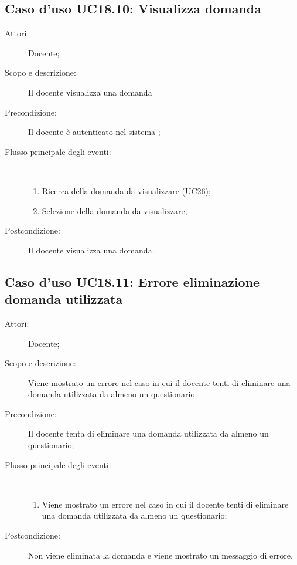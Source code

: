 \subsection{Caso d'uso UC18.10: Visualizza domanda}\begin{description}
	\item[Attori:] Docente;
	\item[Scopo e descrizione:] Il docente visualizza una domanda
	\item[Precondizione:] Il docente è autenticato nel sistema
	;
	
	\item[Flusso principale degli eventi:] \ 
	\begin{enumerate}
		\item Ricerca della domanda da visualizzare (\hyperlink{UC26}{UC26});
		\item Selezione della domanda da visualizzare;
		
	\end{enumerate}
	\item[Postcondizione:] Il docente visualizza una domanda.
\end{description}
\hypertarget{UC18.11}{}
\subsection{Caso d'uso UC18.11: Errore eliminazione domanda utilizzata}\begin{description}
	\item[Attori:] Docente;
	\item[Scopo e descrizione:] Viene mostrato un errore nel caso in cui il docente tenti di eliminare una domanda utilizzata da almeno un questionario
	\item[Precondizione:] Il docente tenta di eliminare una domanda utilizzata da almeno un questionario;
	
	\item[Flusso principale degli eventi:] \ 
	\begin{enumerate}
		\item Viene mostrato un errore nel caso in cui il docente tenti di eliminare una domanda utilizzata da almeno un questionario;
		
	\end{enumerate}
	\item[Postcondizione:] Non viene eliminata la domanda e viene mostrato un messaggio di errore.
\end{description}
\hypertarget{UC19}{}
